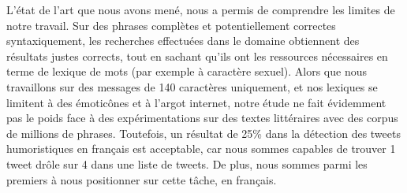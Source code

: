 \documentclass[10pt,a4paper,twoside]{article}
\begin{document}
L'état de l'art que nous avons mené, nous a permis de comprendre les limites de notre travail. Sur des phrases complètes et potentiellement correctes syntaxiquement, les recherches effectuées dans le domaine obtiennent des résultats justes corrects, tout en sachant qu'ils ont les ressources nécessaires en terme de lexique de mots (par exemple à caractère sexuel). Alors que nous travaillons sur des messages de 140 caractères uniquement, et nos lexiques se limitent à des émoticônes et à l'argot internet, notre étude ne fait évidemment pas le poids face à des expérimentations sur des textes littéraires avec des corpus de millions de phrases. Toutefois, un résultat de 25\% dans la détection des tweets humoristiques en français est acceptable, car nous sommes capables de trouver 1 tweet drôle sur 4 dans une liste de tweets. De plus, nous sommes parmi les premiers à nous positionner sur cette tâche, en français.

\vspace{1.7cm}


\nocite{Kiddon11,MihalceaP07}

\end{document}

